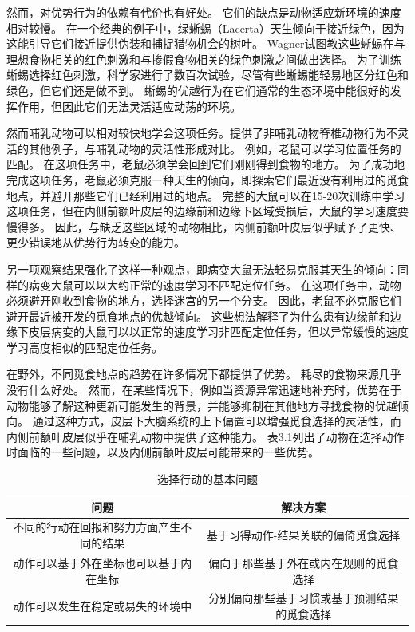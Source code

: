 然而，对优势行为的依赖有代价也有好处。
它们的缺点是动物适应新环境的速度相对较慢。
在一个经典的例子中，绿蜥蜴（Lacerta）天生倾向于接近绿色，因为这能引导它们接近提供伪装和捕捉猎物机会的树叶。
Wagner\cite{wagner1932farbensinn}试图教这些蜥蜴在与理想食物相关的红色刺激和与掺假食物相关的绿色刺激之间做出选择。
为了训练蜥蜴选择红色刺激，科学家进行了数百次试验，尽管有些蜥蜴能轻易地区分红色和绿色，但它们还是做不到。
蜥蜴的优越行为在它们通常的生态环境中能很好的发挥作用，但因此它们无法灵活适应动荡的环境。\par


然而哺乳动物可以相对较快地学会这项任务。\cite{murray2011can}提供了非哺乳动物脊椎动物行为不灵活的其他例子，与哺乳动物的灵活性形成对比。
例如，老鼠可以学习位置任务的匹配。
在这项任务中，老鼠必须学会回到它们刚刚得到食物的地方\cite{marighetto1998effects}。
为了成功地完成这项任务，老鼠必须克服一种天生的倾向，即探索它们最近没有利用过的觅食地点，并避开那些它们已经利用过的地点。
完整的大鼠可以在15-20次训练中学习这项任务，但在内侧前额叶皮层的边缘前和边缘下区域受损后，大鼠的学习速度要慢得多\cite{dias2000effects}。
因此，与缺乏这些区域的动物相比，内侧前额叶皮层似乎赋予了更快、更少错误地从优势行为转变的能力。\par


另一项观察结果强化了这样一种观点，即病变大鼠无法轻易克服其天生的倾向：同样的病变大鼠可以以大约正常的速度学习不匹配定位任务\cite{dias2000effects}。
在这项任务中，动物必须避开刚收到食物的地方，选择迷宫的另一个分支。
因此，老鼠不必克服它们避开最近被开发的觅食地点的优越倾向。
这些想法解释了为什么患有边缘前和边缘下皮层病变的大鼠可以以正常的速度学习非匹配定位任务，但以异常缓慢的速度学习高度相似的匹配定位任务。\par


在野外，不同觅食地点的趋势在许多情况下都提供了优势。
耗尽的食物来源几乎没有什么好处。
然而，在某些情况下，例如当资源异常迅速地补充时，优势在于动物能够了解这种更新可能发生的背景，并能够抑制在其他地方寻找食物的优越倾向。
通过这种方式，皮层下大脑系统的上下偏置可以增强觅食选择的灵活性，而内侧前额叶皮层似乎在哺乳动物中提供了这种能力。
表3.1列出了动物在选择动作时面临的一些问题，以及内侧前额叶皮层可能带来的一些优势。\par


\begin{table}[htbp]
	\newcommand{\tabincell}[2]{\begin{tabular}{@{}#1@{}}#2\end{tabular}} %
	\centering
	\caption{选择行动的基本问题}
	\renewcommand\arraystretch{1.5}	%
	\begin{tabular}{c c }	 %
		\hline	%
		问题 & 解决方案 \\	
		\hline  %
		不同的行动在回报和努力方面产生不同的结果 & 基于习得动作-结果关联的偏倚觅食选择 \\
		\hline
		动作可以基于外在坐标也可以基于内在坐标 & 偏向于那些基于外在或内在规则的觅食选择 \\
		\hline
		动作可以发生在稳定或易失的环境中 & 分别偏向那些基于习惯或基于预测结果的觅食选择 \\
		\hline
	\end{tabular}%
\end{table}%



